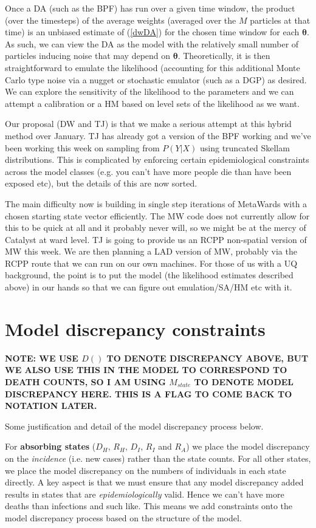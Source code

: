 \documentclass[a4paper]{article}
\newcommand{\btheta}{\bm{\theta}}
\begin{document}
Once a DA (such as the BPF) has run over a given time window, the product (over the timesteps) of the average weights (averaged over the $M$ particles at that time) is an unbiased estimate of (\ref{dwDA}) for the chosen time window for each $\btheta$. As such, we can view the DA as the model with the relatively small number of particles inducing noise that may depend on $\btheta$. Theoretically, it is then straightforward to emulate the likelihood (accounting for this additional Monte Carlo type noise via a nugget or stochastic emulator (such as a DGP) as desired. We can explore the sensitivity of the likelihood to the parameters and we can attempt a calibration or a HM based on level sets of the likelihood as we want. 

Our proposal (DW and TJ) is that we make a serious attempt at this hybrid method over January. TJ has already got a version of the BPF working and we've been working this week on sampling from $P(Y|X)$ using truncated Skellam distributions. This is complicated by enforcing certain epidemiological constraints across the model classes (e.g. you can't have more people die than have been exposed etc), but the details of this are now sorted. 

The main difficulty now is building in single step iterations of MetaWards with a chosen starting state vector efficiently. The MW code does not currently allow for this to be quick at all and it probably never will, so we might be at the mercy of Catalyst at ward level. TJ is going to provide us an RCPP non-spatial version of MW this week. We are then planning a LAD version of MW, probably via the RCPP route that we can run on our own machines. For those of us with a UQ background, the point is to put the model (the likelihood estimates described above) in our hands so that we can figure out emulation/SA/HM etc with it. 

\section*{Model discrepancy constraints}

\textbf{NOTE: WE USE $D()$ TO DENOTE DISCREPANCY ABOVE, BUT WE ALSO USE THIS IN THE MODEL TO CORRESPOND TO DEATH COUNTS, SO I AM USING $M_{state}$ TO DENOTE MODEL DISCREPANCY HERE. THIS IS A FLAG TO COME BACK TO NOTATION LATER.}

Some justification and detail of the model discrepancy process below.

For \textbf{absorbing states} ($D_H$, $R_H$, $D_I$, $R_I$ and $R_A$) we place the model discrepancy on the \textit{incidence} (i.e. new cases) rather than the state counts. For all other states, we place the model discrepancy on the numbers of individuals in each state directly. A key aspect is that we must ensure that any model discrepancy added results in states that are \textit{epidemiologically} valid. Hence we can't have more deaths than infections and such like. This means we add constraints onto the model discrepancy process based on the structure of the model.
\end{document}
